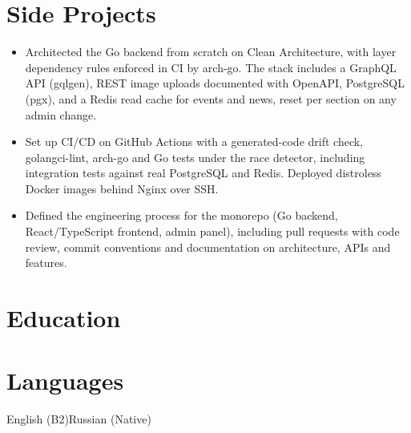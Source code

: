 \documentclass[10pt,a4paper]{article}
\begin{document}
\section*{Side Projects}
\begin{itemize}
  \item Architected the Go backend from scratch on Clean Architecture, with layer dependency rules enforced in CI by arch-go. The stack includes a GraphQL API (gqlgen), REST image uploads documented with OpenAPI, PostgreSQL (pgx), and a Redis read cache for events and news, reset per section on any admin change.
  \item Set up CI/CD on GitHub Actions with a generated-code drift check, golangci-lint, arch-go and Go tests under the race detector, including integration tests against real PostgreSQL and Redis. Deployed distroless Docker images behind Nginx over SSH.
  \item Defined the engineering process for the monorepo (Go backend, React/TypeScript frontend, admin panel), including pull requests with code review, commit conventions and documentation on architecture, APIs and features.
\end{itemize}

\section*{Education}


\section*{Languages}
English (B2)\cvsep Russian (Native)

\end{document}
